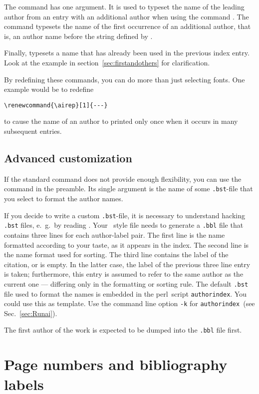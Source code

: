 \documentclass[a4paper]{article}
\newcommand{\perl}{\textsf{perl}}
\newcommand{\file}[1]{\texttt{#1}}
\newcommand{\fnext}[1]{\file{.#1}}
\newcommand{\cmdline}[1]{\texttt{#1}}
\newcommand{\option}[1]{\cmdline{#1}}
\newcommand{\aiperl}{\cmdline{authorindex}}
\newcommand{\ltxinp}[1]{\texttt{\string#1}}
\begin{document}
The command \ltxinp{\aifirst} has one argument.  It is used to typeset the name
of the leading author from an entry with an additional author when using the
command \ltxinp{\aisee}. The command \ltxinp{\aitop} typesets the name of the
first occurrence of an additional author, that is, an author name before the
string defined by \ltxinp{\aisee}.

Finally, \ltxinp{\airep} typesets a name that has already been used in the
previous index entry.  Look at the example in section~\ref{sec:firstandothers}
for clarification.

By redefining these commands, you can do more than just selecting fonts.  One
example would be to redefine
\begin{verbatim}
\renewcommand{\airep}[1]{---}
\end{verbatim}
to cause the name of an author to printed only once when it occurs in many
subsequent entries.


\subsection{Advanced customization}
\label{sec:bsthacker}

If the standard command \ltxinp{\ainamefmt} does not provide enough
flexibility, you can use the command \ltxinp{\authorindexstyle} in the
preamble. Its single argument is the name of some \fnext{bst}-file that you
select to format the author names.

If you decide to write a custom \fnext{bst}-file, it is necessary to understand
hacking \fnext{bst} files, e.~g.\ by reading \cite{Patashnik88b}. Your \BibTeX\ 
style file needs to generate a \fnext{bbl} file that contains three lines for
each author-label pair.  The first line is the name formatted according to your
taste, as it appears in the index.  The second line is the name format used for
sorting. The third line contains the label of the citation, or is empty.  In
the latter case, the label of the previous three line entry is taken;
furthermore, this entry is assumed to refer to the same author as the current
one --- differing only in the formatting or sorting rule. The default
\fnext{bst} file used to format the names is embedded in the \perl\ script
\aiperl. You could use this as template. Use the command line option
\option{-k} for \aiperl\ (see Sec.~\ref{sec:Runai}).

The first author of the work is expected to be dumped into the \fnext{bbl} file
first.


\section{Page numbers and bibliography labels}
\end{document}
